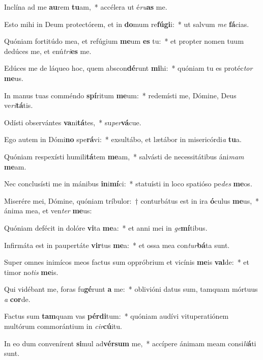 \item Inclína ad me \textbf{au}rem \textbf{tu}am,~* accélera ut é\textit{ru}\textbf{as} me.
\item Esto mihi in Deum protectórem, et in \textbf{do}mum re\textbf{fú}\textbf{gi}i:~* ut salvum \textit{me} \textbf{fá}cias.
\item Quóniam fortitúdo mea, et refúgium \textbf{me}um \textbf{es} tu:~* et propter nomen tuum dedúces me, et enú\textit{tri}\textbf{es} me.
\item Edúces me de láqueo hoc, quem abscon\textbf{dé}runt \textbf{mi}hi:~* quóniam tu es protéc\textit{tor} \textbf{me}us.
\item In manus tuas comméndo \textbf{spí}ritum \textbf{me}um:~* redemísti me, Dómine, Deus ve\textit{ri}\textbf{tá}tis.
\item Odísti observántes \textbf{va}ni\textbf{tá}tes,~* su\textit{per}\textbf{vá}cue.
\item Ego autem in Dómi\textbf{no} spe\textbf{rá}vi:~* exsultábo, et lætábor in misericórdi\textit{a} \textbf{tu}a.
\item Quóniam respexísti humili\textbf{tá}tem \textbf{me}am,~* salvásti de necessitátibus áni\textit{mam} \textbf{me}am.
\item Nec conclusísti me in mánibus \textbf{in}i\textbf{mí}ci:~* statuísti in loco spatióso pe\textit{des} \textbf{me}os.
\item Miserére mei, Dómine, quóniam tríbulor:~† conturbátus est in ira \textbf{ó}culus \textbf{me}us,~* ánima mea, et ven\textit{ter} \textbf{me}us:
\item Quóniam defécit in dolóre \textbf{vi}ta \textbf{me}a:~* et anni mei in \textit{ge}\textbf{mí}tibus.
\item Infirmáta est in paupertáte \textbf{vir}tus \textbf{me}a:~* et ossa mea con\textit{tur}\textbf{bá}ta sunt.
\item Super omnes inimícos meos factus sum oppróbrium et vicínis \textbf{me}is \textbf{val}de:~* et timor no\textit{tis} \textbf{me}is.
\item Qui vidébant me, foras fu\textbf{gé}runt \textbf{a} me:~* oblivióni datus sum, tamquam mórtuus \textit{a} \textbf{cor}de.
\item Factus sum \textbf{tam}quam vas \textbf{pér}\textbf{di}tum:~* quóniam audívi vituperatiónem multórum commorántium in \textit{cir}\textbf{cú}itu.
\item In eo dum convenírent \textbf{si}mul ad\textbf{vér}\textbf{sum} me,~* accípere ánimam meam consi\textit{li}\textbf{á}ti sunt.
